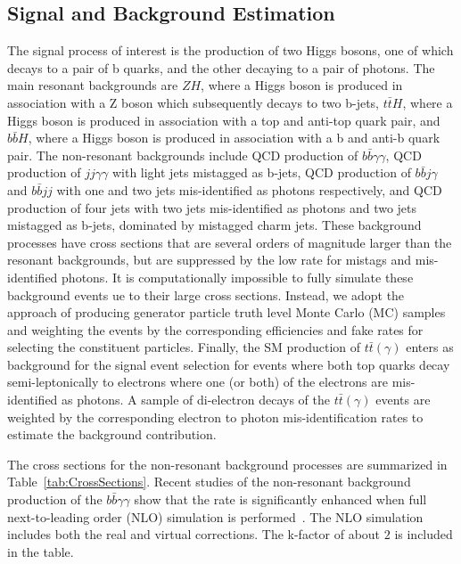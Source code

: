 \subsection{Signal and Background Estimation}
\label{sec:bkgestimation}
The signal process of interest is the production of two Higgs bosons, one of which decays to a pair of b quarks, and the other decaying to a pair of photons. The main resonant backgrounds are $ZH$, where a Higgs boson is produced in association with a Z boson which subsequently decays to two b-jets, $t\bar{t}H$, where a Higgs boson is produced in association with a top and anti-top quark pair, and $b\bar{b}H$, where a Higgs boson is produced in association with a b and anti-b quark pair. The non-resonant backgrounds include QCD production  of $b \bar{b} \gamma\gamma$, QCD production of $jj \gamma\gamma$ with light jets mistagged  as b-jets, QCD production of $b \bar{b} j \gamma$ and $b \bar{b} jj$ with one and two jets mis-identified as photons respectively, and QCD production of four jets with two jets mis-identified  as photons and two jets mistagged as b-jets, dominated by mistagged charm jets. 
These background processes have cross sections that are several orders of magnitude larger than the resonant backgrounds, but are suppressed
by the low rate for mistags and mis-identified photons.  It is computationally impossible to fully simulate these background events ue to their large cross sections. Instead, we adopt the approach of producing generator particle truth level Monte Carlo (MC) samples and weighting the events by the corresponding efficiencies and fake rates for selecting the constituent particles. Finally, the SM  production of $t\bar{t}(\gamma)$ enters as background for the signal event selection for events where both top quarks decay semi-leptonically to electrons where one (or both) of the electrons are mis-identified as photons. A sample of di-electron decays of the $t\bar{t}(\gamma)$ events are weighted by the corresponding electron to photon mis-identification rates to estimate the background contribution.

The cross sections for the non-resonant background processes are summarized in Table~\ref{tab:CrossSections}. Recent studies of the non-resonant background production of the $b \bar{b} \gamma\gamma$ show that the rate is significantly enhanced when full next-to-leading order (NLO) simulation is performed~\cite{Azatov:2015oxa}. The NLO simulation includes both the real and virtual corrections. The k-factor of about $2$ is included in the table.  


